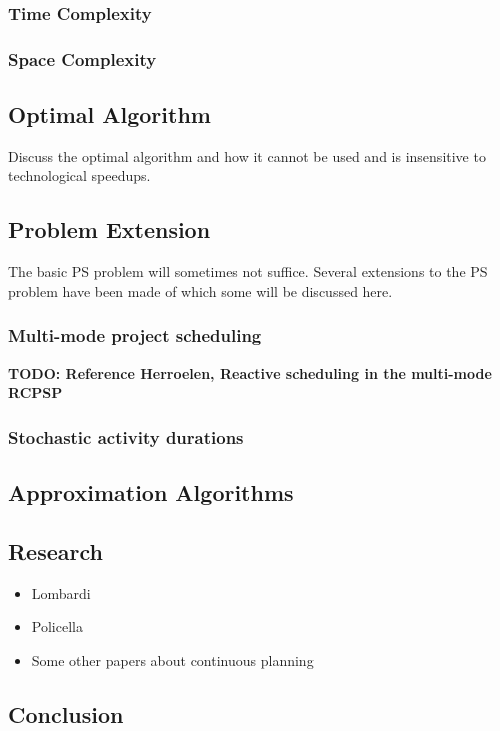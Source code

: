 \documentclass{article}
\newcommand{\TODO}[1]{{\color{red}\textbf{TODO: #1}}}
\begin{document}
\subsubsection{Time Complexity}
\subsubsection{Space Complexity}

\subsection{Optimal Algorithm}
Discuss the optimal algorithm and how it cannot be used and is insensitive to technological speedups.

\subsection{Problem Extension}
The basic PS problem will sometimes not suffice. Several extensions to the PS problem have been made of which some will be discussed here. 
\subsubsection{Multi-mode project scheduling}
\TODO{Reference Herroelen, Reactive scheduling in the multi-mode RCPSP}

\subsubsection{Stochastic activity durations}
\subsection{Approximation Algorithms}


\subsection{Research}

\begin{itemize}
\item Lombardi
\item Policella
\item Some other papers about continuous planning
\end{itemize}

\subsection{Conclusion}
\end{document}
